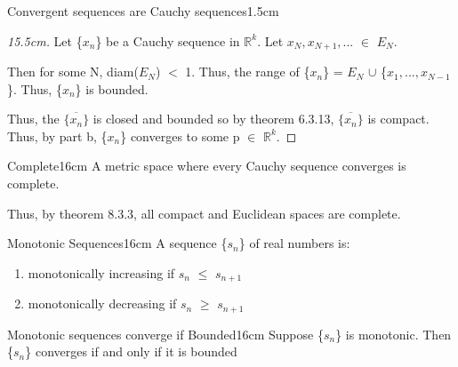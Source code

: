 \begin{ltheorem}{Convergent sequences are Cauchy sequences}{1.5cm}
            \begin{proof}[15.5cm]
                Let \{$x_n$\} be a Cauchy sequence in $\mathbb{R}^k$.
				Let $x_N, x_{N+1}, ... $ $\in$ $E_N$.

				Then for some N, diam($E_N$) $<$ 1.
				Thus, the range of \{$x_n$\}
                = $E_N$ $\cup$ \{$x_1, ... , x_{N-1}$\}.
				Thus, \{$x_n$\} is bounded.

				Thus, the $\overline{\{x_n\}}$ is closed and bounded so by
                {\color{red} theorem 6.3.13}, $\overline{\{x_n\}}$ is compact.
				Thus, by part b, \{$x_n$\} converges to some
                p $\in$ $\mathbb{R}^k$.
            \end{proof}
    \end{ltheorem}

    \newpage


    
    \begin{definition}{Complete}{16cm}
        A metric space where every Cauchy sequence converges
        is {\color{lblue} complete}.

		Thus, by {\color{red} theorem 8.3.3}, all compact and Euclidean
		spaces are complete.
    \end{definition}
    
    \vspace{0.5cm}



    \begin{definition}{Monotonic Sequences}{16cm}
        A sequence \{$s_n$\} of real numbers is:
    \end{definition}

	\begin{enumerate}[label=(\alph*), leftmargin=2cm, itemsep=0.1cm]
		\item {\color{lblue} monotonically increasing} if $s_n$ $\leq$ $s_{n+1}$
		
		\item {\color{lblue} monotonically decreasing} if $s_n$ $\geq$ $s_{n+1}$
	\end{enumerate}

    \vspace{0.5cm}



    \begin{wtheorem}{Monotonic sequences converge if Bounded}{16cm}
        Suppose \{$s_n$\} is monotonic. Then \{$s_n$\} converges if
		and only if it is bounded
    \end{wtheorem}
    
